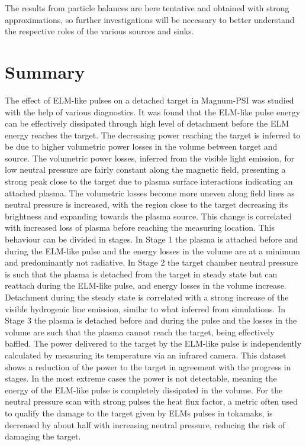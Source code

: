 The results from particle balances are here tentative and obtained with strong approximations, so further investigations will be necessary to better understand the respective roles of the various sources and sinks.


\section{Summary}\label{summary magnum-psi}

The effect of ELM-like pulses on a detached target in Magnum-PSI was studied with the help of various diagnostics. It was found that the ELM-like pulse energy can be effectively dissipated through high level of detachment before the ELM energy reaches the target. The decreasing power reaching the target is inferred to be due to higher volumetric power losses in the volume between target and source. The volumetric power losses, inferred from the visible light emission, for low neutral pressure are fairly constant along the magnetic field, presenting a strong peak close to the target due to plasma surface interactions indicating an attached plasma. The volumetric losses become more uneven along field lines as neutral pressure is increased, with the region close to the target decreasing its brightness and expanding towards the plasma source. This change is correlated with increased loss of plasma before reaching the measuring location. This behaviour can be divided in stages. In Stage 1 the plasma is attached before and during the ELM-like pulse and the energy losses in the volume are at a minimum and predominantly not radiative. In Stage 2 the target chamber neutral pressure is such that the plasma is detached from the target in steady state but can reattach during the ELM-like pulse, and energy losses in the volume increase. Detachment during the steady state is correlated with a strong increase of the visible hydrogenic line emission, similar to what inferred from simulations.\cite{Zhou2022} In Stage 3 the plasma is detached before and during the pulse and the losses in the volume are such that the plasma cannot reach the target, being effectively baffled. The power delivered to the target by the ELM-like pulse is independently calculated by measuring its temperature via an infrared camera. This dataset shows a reduction of the power to the target in agreement with the progress in stages. In the most extreme cases the power is not detectable, meaning the energy of the ELM-like pulse is completely dissipated in the volume. For the neutral pressure scan with strong pulses the heat flux factor, a metric often used to qualify the damage to the target given by ELMs pulses in tokamaks, is decreased by about half with increasing neutral pressure, reducing the risk of damaging the target.

